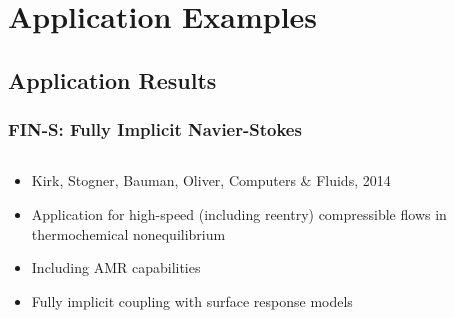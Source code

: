 \section{Application Examples}
\subsection{Application Results}



\frame
{
  \frametitle{FIN-S: Fully Implicit Navier-Stokes}

  \begin{columns}
    \begin{column}{0.45\textwidth}
      \begin{itemize}
      \item Kirk, Stogner, Bauman, Oliver, Computers \& Fluids, 2014
      \item Application for high-speed (including reentry)
        compressible flows in thermochemical nonequilibrium
      \item Including AMR capabilities
      \item Fully implicit coupling with surface response models
      \end{itemize}
    \end{column}
    \begin{column}{0.45\textwidth}
      \begin{center}
      \end{center}
    \end{column}
  \end{columns}
}


